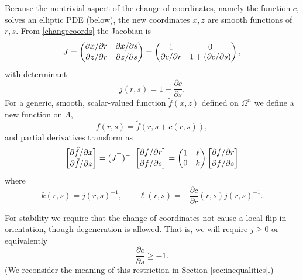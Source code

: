 \documentclass[letterpaper,final,12pt,reqno]{amsart}
\begin{document}
Because the nontrivial aspect of the change of coordinates, namely the function $c$, solves an elliptic PDE (below), the new coordinates $x,z$ are smooth functions of $r,s$.  From \eqref{changecoords} the Jacobian is
\begin{equation}
J = \begin{pmatrix} \partial x / \partial r & \partial x / \partial s \\ {\large\strut} \partial z / \partial r & \partial z / \partial s \end{pmatrix} = \begin{pmatrix} 1 & 0 \\ \partial c/\partial r & 1+(\partial c/\partial s) \end{pmatrix}, \label{jacchange}
\end{equation}
with determinant
\begin{equation}
j(r,s) = 1+\frac{\partial c}{\partial s}. \label{definej}
\end{equation}
For a generic, smooth, scalar-valued function $\tilde f(x,z)$ defined on $\Omega^n$ we define a new function on $\Lambda$,
    $$f(r,s) = \tilde f(r,s+c(r,s)),$$
and partial derivatives transform as
\begin{equation}
\begin{bmatrix} \partial \tilde f / \partial x \\ {\large\strut} \partial \tilde f / \partial z\end{bmatrix} = (J^\top)^{-1} \begin{bmatrix} \partial f / \partial r \\ {\large\strut} \partial f / \partial s\end{bmatrix} = \begin{pmatrix} 1 & \ell \\ 0 & k \end{pmatrix} \begin{bmatrix} \partial f / \partial r \\ {\large\strut} \partial f / \partial s\end{bmatrix} \label{changederivatives}
\end{equation}
where
\begin{equation}
k(r,s) = j(r,s)^{-1}, \qquad \ell(r,s) = - \frac{\partial c}{\partial r}(r,s) j(r,s)^{-1}. \label{definejkl}
\end{equation}

For stability we require that the change of coordinates not cause a local flip in orientation, though degeneration is allowed.  That is, we will require $j\ge 0$ or equivalently
\begin{equation}
\frac{\partial c}{\partial s} \ge -1. \label{differentialVI}
\end{equation}
(We reconsider the meaning of this restriction in Section \ref{sec:inequalities}.)
\end{document}
